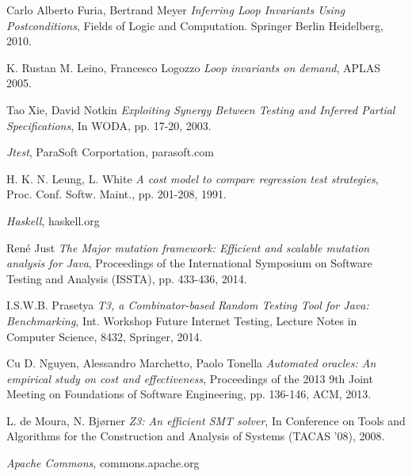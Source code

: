 \documentclass[a4paper, fleqn]{article}
\begin{document}
\begin{thebibliography}{9}
Carlo Alberto Furia, Bertrand Meyer
  \emph{Inferring Loop Invariants Using Postconditions},
Fields of Logic and Computation. Springer Berlin Heidelberg, 2010.

K. Rustan M. Leino, Francesco Logozzo
  \emph{Loop invariants on demand},
 APLAS 2005.

Tao Xie, David Notkin
  \emph{Exploiting Synergy Between Testing and Inferred Partial Specifications}, In WODA, pp. 17-20, 2003.

  \emph{Jtest},
ParaSoft Corportation, parasoft.com
 
H. K. N. Leung, L. White
  \emph{A cost model to compare
regression test strategies},
Proc. Conf. Softw. Maint., pp. 201-208, 1991.

  \emph{Haskell},
haskell.org
 
{Ren{\'e} Just}
  \emph{The {M}ajor mutation framework: Efficient and scalable
	mutation analysis for {J}ava},
Proceedings of the International Symposium on Software
	Testing and Analysis (ISSTA),
   pp. 433-436, 2014.

I.S.W.B. Prasetya
  \emph{T3, a Combinator-based Random Testing Tool for Java: Benchmarking},
Int. Workshop Future Internet Testing, Lecture Notes in Computer Science, 8432, Springer, 2014.

Cu D. Nguyen, Alessandro Marchetto, Paolo Tonella
  \emph{Automated oracles: An empirical study on cost and effectiveness},
  Proceedings of the 2013 9th Joint Meeting on Foundations of Software Engineering, pp. 136-146, ACM, 2013.

L. de Moura, N. Bj{\o}rner
  \emph{Z3: An efficient SMT solver},
In Conference on Tools and Algorithms for the Construction and Analysis of Systems (TACAS ’08), 2008.

  \emph{Apache Commons},
commons.apache.org

\end{thebibliography}
\end{document}
